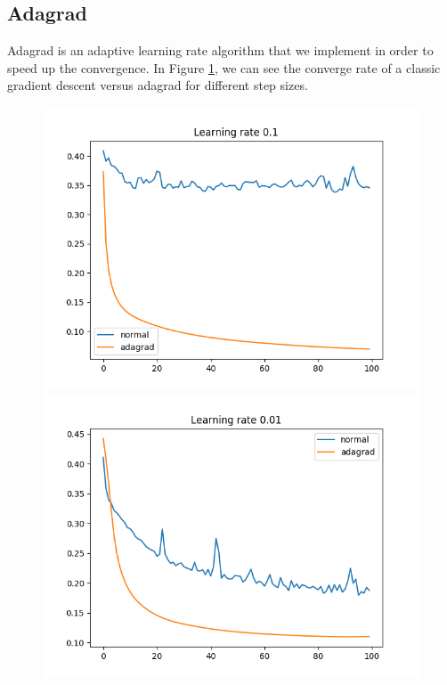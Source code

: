 \documentclass[11pt]{article}
\begin{document}
\subsection{Adagrad}
Adagrad \cite{AdaGrad} is an adaptive learning rate algorithm that we implement in order to speed up the convergence. In Figure \ref{fig: adagrad}, we can see the converge rate of a classic gradient descent versus adagrad for different step sizes.
\begin{figure}[H]
\label{fig: adagrad}
\centering
\includegraphics[scale=0.5]{images/adagrad_plot_0,1.png}	
\includegraphics[scale=0.5]{images/adagrad_plot_0,01.png}	

\end{figure}
\end{document}
